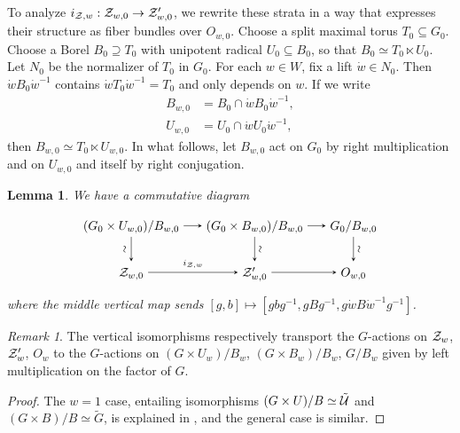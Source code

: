 \documentclass[a4paper,10pt,leqno]{amsart}
\theoremstyle{plain}
\theoremstyle{plain}
\theoremstyle{plain}
\newtheorem{lem}[thm]{Lemma}
\theoremstyle{definition}
\theoremstyle{remark}
\newtheorem{rem}[thm]{Remark}
\begin{document}
To analyze $i_{\cal{Z}, w} : \cal{Z}_{w, 0} \to \cal{Z}'_{w, 0}$, we rewrite these strata in a way that expresses their structure as fiber bundles over $O_{w, 0}$.
Choose a split maximal torus $T_0 \subseteq G_0$.
Choose a Borel $B_0 \supseteq T_0$ with unipotent radical $U_0 \subseteq B_0$, so that $B_0 \simeq T_0 \ltimes U_0$.
Let $N_0$ be the normalizer of $T_0$ in $G_0$.
For each $w \in W$, fix a lift $\dot{w} \in N_0$.
Then $\dot{w}B_0 \dot{w}^{-1}$ contains $\dot{w}T_0 \dot{w}^{-1} = T_0$ and only depends on $w$.
If we write 
\begin{align}
B_{w, 0} &= B_0 \cap \dot{w}B_0 \dot{w}^{-1},\\
U_{w, 0} &= U_0 \cap \dot{w}U_0 \dot{w}^{-1},
\end{align}
then $B_{w, 0} \simeq T_0 \ltimes U_{w, 0}$.
In what follows, let $B_{w, 0}$ act on $G_0$ by right multiplication and on $U_{w, 0}$ and itself by right conjugation.

\begin{lem}\label{lem:assoc-bundle}
We have a commutative diagram
\begin{equation}
\begin{tikzpicture}[baseline=(current bounding box.center), >=stealth]
\matrix(m)[matrix of math nodes, row sep=2em, column sep=1.5em, text height=2ex, text depth=0.5ex]
{	(G_0 \times U_{w, 0})/B_{w, 0}
		&(G_0 \times B_{w, 0})/B_{w, 0}
		&G_0/B_{w, 0}\\
	\cal{Z}_{w, 0}
		&\cal{Z}'_{w, 0}
		&O_{w, 0}\\
		};
\path[->,font=\scriptsize, auto]
(m-1-1)		edge (m-1-2)
(m-1-2)		edge (m-1-3)
(m-1-1)		edge node[rotate=90,above]{$\sim$} (m-2-1)
(m-1-2)		edge node[rotate=90,below]{$\sim$} (m-2-2)
(m-1-3)		edge node[rotate=90,below]{$\sim$} (m-2-3)
(m-2-1)		edge node{$i_{\cal{Z}, w}$} (m-2-2)
(m-2-2)		edge (m-2-3);
\end{tikzpicture}
\end{equation}
where the middle vertical map sends $[g, b] \mapsto [gbg^{-1}, gBg^{-1}, g\dot{w}B\dot{w}^{-1}g^{-1}]$.
\end{lem}

\begin{rem}
The vertical isomorphisms respectively transport the $G$-actions on $\cal{Z}_w$, $\cal{Z}'_w$, $O_w$ to the $G$-actions on $(G \times U_w)/B_w$, $(G \times B_w)/B_w$, $G/B_w$ given by left multiplication on the factor of $G$.
\end{rem}

\begin{proof}
The $w = 1$ case, entailing isomorphisms $(G \times U)/B \simeq \tilde{\cal{U}}$ and $(G \times B)/B \simeq \tilde{G}$, is explained in \cite[Ch.\ 4]{slodowy}, and the general case is similar.
\end{proof}
\end{document}
